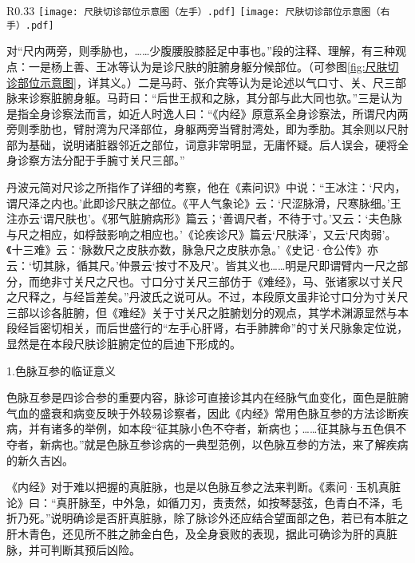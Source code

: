 \documentclass[12pt]{ctexbook}
\begin{document}


\begin{wrapfigure}[16]{R}{0.33\textwidth} %
  \centering
    {\texttt{[image: 尺肤切诊部位示意图（左手）.pdf]}}
  \hspace{3mm}
    {\texttt{[image: 尺肤切诊部位示意图（右手）.pdf]}}
  \caption{尺肤切诊部位示意图}\label{fig:尺肤切诊部位示意图}
\end{wrapfigure}
对“尺内两旁，则季胁也，……少腹腰股膝胫足中事也。”段的注释、理解，有三种观点：一是杨上善、王冰等认为是诊尺肤的脏腑身躯分候部位。（可参图\ref{fig:尺肤切诊部位示意图}，详其义。）二是马莳、张介宾等认为是论述以气口寸、关、尺三部脉来诊察脏腑身躯。马莳曰：“后世王叔和之脉，其分部与此大同也欤。”三是认为是指全身诊察法而言，如近人时逸人曰：“《内经》原意系全身诊察法，所谓尺内两旁则季肋也，臂肘湾为尺泽部位，身躯两旁当臂肘湾处，即为季肋。其余则以尺肘部为基础，说明诸脏器邻近之部位，词意非常明显，无庸怀疑。后人误会，硬将全身诊察方法分配于手腕寸关尺三部。”

丹波元简对尺诊之所指作了详细的考察，他在《素问识》中说：“王冰注：‘尺内，谓尺泽之内也。’此即诊尺肤之部位。《平人气象论》云：‘尺涩脉滑，尺寒脉细。’王注亦云‘谓尺肤也’。《邪气脏腑病形》篇云；‘善调尺者，不待于寸。’又云：‘夫色脉与尺之相应，如桴鼓影响之相应也。’《论疾诊尺》篇云‘尺肤泽’，又云‘尺肉弱’。《十三难》云：‘脉数尺之皮肤亦数，脉急尺之皮肤亦急。’《史记·仓公传》亦云：‘切其脉，循其尺。’仲景云‘按寸不及尺’。皆其义也……明是尺即谓臂内一尺之部分，而绝非寸关尺之尺也。寸口分寸关尺三部仿于《难经》，马、张诸家以寸关尺之尺释之，与经旨差矣。”丹波氏之说可从。不过，本段原文虽非论寸口分为寸关尺三部以诊各脏腑，但《难经》关于寸关尺之脏腑划分的观点，其学术渊源显然与本段经旨密切相关，而后世盛行的“左手心肝肾，右手肺脾命”的寸关尺脉象定位说，显然是在本段尺肤诊脏腑定位的启迪下形成的。


1.色脉互参的临证意义

色脉互参是四诊合参的重要内容，脉诊可直接诊其内在经脉气血变化，面色是脏腑气血的盛衰和病变反映于外较易诊察者，因此《内经》常用色脉互参的方法诊断疾病，并有诸多的举例，如本段“征其脉小色不夺者，新病也；……征其脉与五色俱不夺者，新病也。”就是色脉互参诊病的一典型范例，以色脉互参的方法，来了解疾病的新久吉凶。

《内经》对于难以把握的真脏脉，也是以色脉互参之法来判断。《素问·玉机真脏论》曰：“真肝脉至，中外急，如循刀刃，责责然，如按琴瑟弦，色青白不泽，毛折乃死。”说明确诊是否肝真脏脉，除了脉诊外还应结合望面部之色，若已有本脏之肝木青色，还见所不胜之肺金白色，及全身衰败的表现，据此可确诊为肝的真脏脉，并可判断其预后凶险。
\end{document}
